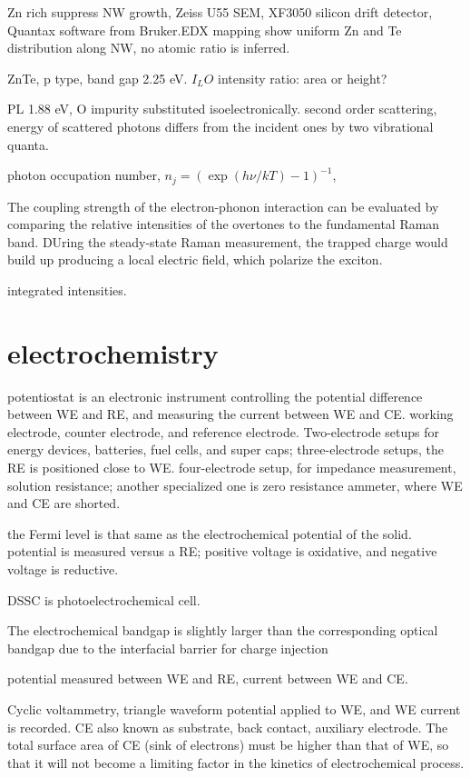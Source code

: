 Zn rich suppress NW growth, Zeiss U55 SEM, XF3050 silicon drift detector, Quantax software from Bruker.EDX mapping show uniform Zn and Te distribution along NW, no atomic ratio is inferred. \cite{Rueda-Fonseca2014} 

ZnTe, p type, band gap 2.25 eV. $I_LO$ intensity ratio: area or height? 

PL 1.88 eV, O impurity substituted isoelectronically. second order scattering, energy of scattered photons differs from the incident ones by two vibrational quanta.  \cite{Irwin1970}

photon occupation number, $n_j = (\exp(h\nu/kT) - 1)^{-1}$, 


The coupling strength of the electron-phonon interaction can be evaluated by comparing the relative intensities of the overtones to the fundamental Raman band. DUring the steady-state Raman measurement, the trapped charge would build up producing a local electric field, which polarize the exciton. \cite{Zhang2012}

integrated intensities. 

\section{electrochemistry} 

potentiostat is an electronic instrument controlling the potential difference between WE and RE, and measuring the current between WE and CE. working electrode, counter electrode, and reference electrode. Two-electrode setups for energy devices, batteries, fuel cells, and super caps; three-electrode setups, the RE is positioned close to WE. four-electrode setup, for impedance measurement, solution resistance; another specialized one is zero resistance ammeter, where WE and CE are shorted. 

the Fermi level is that same as the electrochemical potential of the solid. potential is measured versus a RE; positive voltage is oxidative, and negative voltage is reductive. 

DSSC is photoelectrochemical cell.

The electrochemical bandgap is slightly larger than the corresponding optical bandgap due to the interfacial barrier for charge injection

potential measured between WE and RE, current between WE and CE.\cite{Anon2003} 


Cyclic voltammetry, triangle waveform potential applied to WE, and WE current is recorded. CE also known as substrate, back contact, auxiliary electrode. The total surface area of CE (sink of electrons) must be higher than that of WE, so that it will not become a limiting factor in the kinetics of electrochemical process.  

